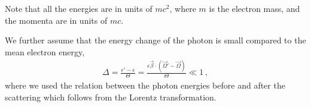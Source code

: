 \documentclass[main.tex]{subfiles}
\begin{document}
Note that all the energies are in units of \(mc^2\), where \(m\) is the electron mass, and the momenta are in units of \(mc\). 

We further assume that the energy change of the photon is small compared to the mean electron energy, 
%
\begin{align}
\Delta = \frac{\epsilon ' - \epsilon }{\Theta } = \frac{\epsilon \vec{\beta} \cdot (\vec{\Omega}' - \vec{\Omega})}{\Theta } \ll 1 
\,,
\end{align}
%
where we used the relation between the photon energies before and after the scattering which follows from the Lorentz transformation. 
\end{document}

